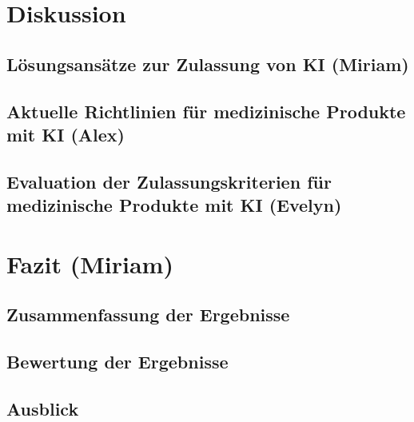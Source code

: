 \documentclass[a4paper, 11pt]{article}
\begin{document}
	\section{Diskussion}\label{sec:discussion}
		
		\subsection{Lösungsansätze zur Zulassung von KI  \small{(Miriam)}} \label{sec:solutions}
			
		\subsection{Aktuelle Richtlinien für medizinische Produkte mit KI \small{(Alex)}}\label{sec:guidlines}
			
		\subsection{Evaluation der Zulassungskriterien für medizinische Produkte mit KI \small{(Evelyn)}}\label{sec:sufficient-criteria}
			
		
	
	\newpage
	\section{Fazit \small{(Miriam)}}\label{sec:conclusion}
		
		\subsection{Zusammenfassung der Ergebnisse}\label{sec:summary}
			
		\subsection{Bewertung der Ergebnisse}\label{sec:rating}
			
		\subsection{Ausblick}\label{sec:perspective}
			
	  

    \newpage
    \printglossary[type=\acronymtype,title={Akronyme}]
   
    \newpage
    \nocite{*}
    \printbibliography{}
	
    \newpage
    \printglossary[type=main,title={Glossar}]
\end{document}
